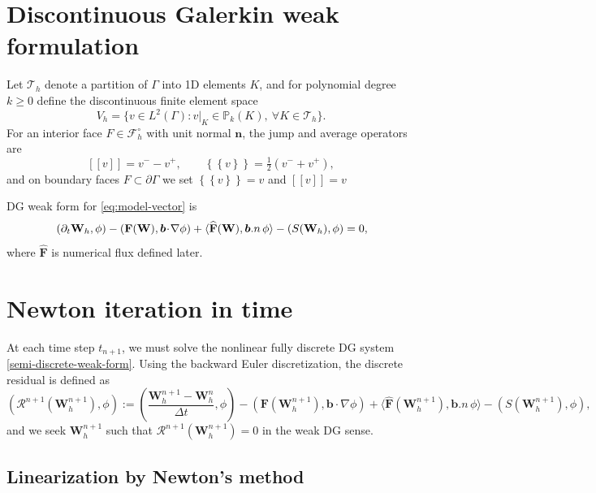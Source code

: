\documentclass[11pt]{article}
\newcommand{\avg}[1]{\left\{\!\!\left\{#1\right\}\!\!\right\}}
\newcommand{\jump}[1]{\left[\!\left[#1\right]\!\right]}
\newcommand{\dt}{\Delta t}
\newcommand{\Vh}{V_h}
\newcommand{\Th}{\mathcal{T}_h}
\newcommand{\Fh}{\mathcal{F}_h}
\begin{document}
\section{Discontinuous Galerkin weak formulation}


Let $\Th$ denote a partition of $\Gamma$ into 1D elements $K$, and for
polynomial degree $k\ge0$ define the discontinuous finite element space
\[
  \Vh = \{v\in L^2(\Gamma): v|_K \in \mathbb P_k(K),\ \forall K\in\Th\}.
\]
For an interior face $F\in\Fh^\circ$ with unit normal $\bm n$,
the jump and average operators are
\[
  \jump{v}=v^- - v^+,
  \qquad
  \avg{v}=\tfrac12(v^-+v^+),
\]
and on boundary faces $F\subset\partial\Gamma$ we set
$\avg{v}=v$ and $\jump{v}=v$

DG weak form for \eqref{eq:model-vector} is 
\begin{equation}{\label{semi-discrete-weak-form}}
     \left( \partial_t \mathbf{W}_h , \phi \right)
  - (\mathbf{F}(\mathbf{W}), \bm b\!\cdot\!\nabla \phi) + \langle \widehat{\mathbf{F}}(\mathbf{W}), \bm b.n \, \phi \rangle
  - (S(\mathbf{W}_h), \phi) = 0,
\end{equation}
where $\widehat{\mathbf{F}}$ is numerical flux defined later.

\section{Newton iteration in time}

At each time step $t_{n+1}$, we must solve the nonlinear fully discrete DG system
\eqref{semi-discrete-weak-form}.
Using the backward Euler discretization, the discrete residual is defined as
\begin{equation}\label{def:residual-vector}
  \left(\mathcal{R}^{n+1}(\mathbf{W}_h^{n+1}), \phi\right)
  :=
  \left(\frac{\mathbf{W}_h^{n+1} - \mathbf{W}_h^n}{\dt}, \phi \right)
  - (\mathbf{F}(\mathbf{W}_h^{n+1}), \bm b\!\cdot\!\nabla \phi) + \langle \widehat{\mathbf{F}}(\mathbf{W}_h^{n+1}), \bm b.n \, \phi \rangle
  - (S(\mathbf{W}_h^{n+1}), \phi),
\end{equation}
and we seek $\mathbf{W}_h^{n+1}$ such that
$\mathcal{R}^{n+1}(\mathbf{W}_h^{n+1}) = 0$ in the weak DG sense.

\subsection*{Linearization by Newton’s method}
\end{document}

